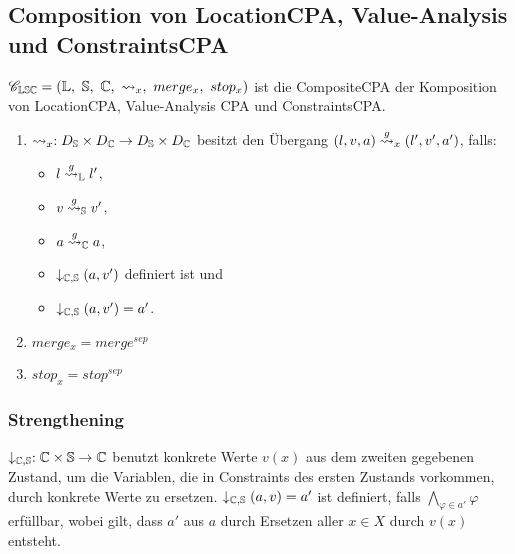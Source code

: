 \subsection{Composition von LocationCPA, Value-Analysis und ConstraintsCPA}
$\composition_{\location\symex\constraints} = (\location,\ \symex,\ \constraints,\ \transfer_x,\ merge_x,\ stop_x)$ ist die CompositeCPA der Komposition von LocationCPA, Value-Analysis CPA und ConstraintsCPA.
  \begin{enumerate}
    \item $\rightsquigarrow_x : D_{\mathbb{S}} \times D_{\mathbb{C}} \rightarrow D_{\mathbb{S}} \times D_{\mathbb{C}}$ besitzt
          den \"Ubergang $(l, v, a) \overset{g}{\rightsquigarrow}_x (l', v', a')$,
          falls:
          \begin{itemize}
            \item $l \overset{g}{\rightsquigarrow}_{\mathbb{L}} l'$,
            \item $v \overset{g}{\rightsquigarrow}_{\mathbb{S}} v'$,
            \item $a \overset{g}{\rightsquigarrow}_{\mathbb{C}} a$,
            \item $\downarrow_{\mathbb{C}, \mathbb{S}} (a, v')$ definiert ist und
            \item $\downarrow_{\mathbb{C}, \mathbb{S}} (a, v') = a'$.
          \end{itemize}
    \item $merge_x = merge^{sep}$
    \item $stop_x = stop^{sep}$
  \end{enumerate}
\subsubsection{Strengthening}
  $\downarrow_{\mathbb{C}, \mathbb{S}} : \mathbb{C} \times \mathbb{S} \rightarrow \mathbb{C}$ benutzt konkrete Werte $v(x)$ aus dem zweiten gegebenen Zustand, um die Variablen, die in Constraints des ersten Zustands vorkommen, durch konkrete Werte zu ersetzen.
$\downarrow_{\mathbb{C}, \mathbb{S}} (a, v) = a'$ ist definiert, falls $\displaystyle\bigwedge_{\varphi \in a'} \varphi$ erf\"ullbar, wobei gilt, dass $a'$ aus $a$ durch Ersetzen aller $x \in X$ durch $v(x)$ entsteht.

